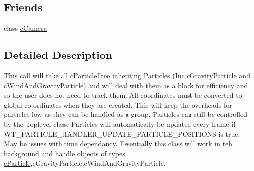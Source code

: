 \subsection*{Friends}
\begin{DoxyCompactItemize}
\item 
\hypertarget{classc_particle_handler_a930db2797d94f26b57e430e155ad81ba}{
class \hyperlink{classc_particle_handler_a930db2797d94f26b57e430e155ad81ba}{cCamera}}
\label{classc_particle_handler_a930db2797d94f26b57e430e155ad81ba}

\end{DoxyCompactItemize}


\subsection{Detailed Description}
This call will take all cParticleFree inheriting Particles (Inc cGravityParticle and cWindAndGravityParticle) and will deal with them as a block for efficiency and so the user does not need to track them. All coordinates must be converted to global co-\/ordinates when they are created. This will keep the overheads for particles low as they can be handled as a group. Particles can still be controlled by the Toplevel class. Particles will automatically be updated every frame if WT\_\-PARTICLE\_\-HANDLER\_\-UPDATE\_\-PARTICLE\_\-POSITIONS is true. May be issues with time dependancy. Essentially this class will work in teh background and handle objects of types \hyperlink{classc_particle}{cParticle},cGravityParticle,cWindAndGravityParticle. 